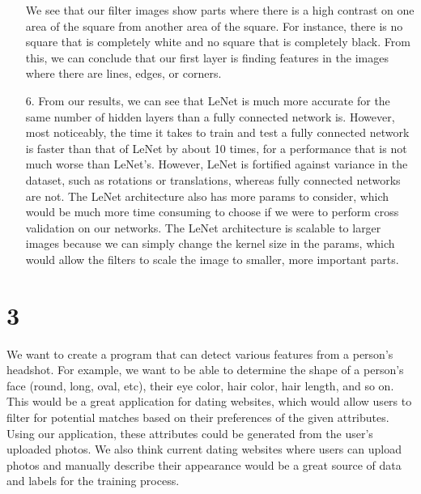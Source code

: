 \documentclass[11pt]{article}
\begin{document}
\begin{itemize}
We see that our filter images show parts where there is a high contrast on one area of the square from another area of the square. For instance, there is no square that is completely white and no square that is completely black. From this, we can conclude that our first layer is finding features in the images where there are lines, edges, or corners. 
\item[6.] From our results, we can see that LeNet is much more accurate for the same number of hidden layers than a fully connected network is. However, most noticeably, the time it takes to train and test a fully connected network is faster than that of LeNet by about 10 times, for a performance that is not much worse than LeNet's. However, LeNet is fortified against variance in the dataset, such as rotations or translations, whereas fully connected networks are not. The LeNet architecture also has more params to consider, which would be much more time consuming to choose if we were to perform cross validation on our networks. The LeNet architecture is scalable to larger images because we can simply change the kernel size in the params, which would allow the filters to scale the image to smaller, more important parts.
\end{itemize}
\newpage
\section*{3}
We want to create a program that can detect various features from a person's headshot. For example, we want to be able to determine the shape of a person's face (round, long, oval, etc), their eye color, hair color, hair length, and so on. This would be a great application for dating websites, which would allow users to filter for potential matches based on their preferences of the given attributes. Using our application, these attributes could be generated from the user's uploaded photos. We also think current dating websites where users can upload photos and manually describe their appearance would be a great source of data and labels for the training process.
\end{document}
